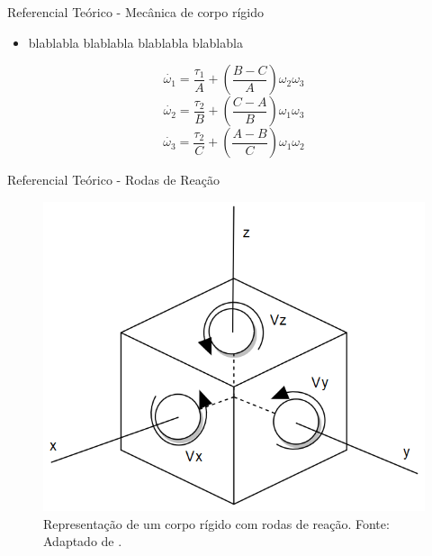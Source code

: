 \documentclass{beamer}
\begin{document}

\begin{frame}{Referencial Teórico - Mecânica de corpo rígido}
	\begin{itemize}
		\justifying
		\item blablabla blablabla blablabla blablabla
    \end{itemize}

	\begin{equation}
	  \dot{\omega_{1}}=\frac{\tau_{1}}{A}+\left(\frac{B-C}{A}\right)\omega_{2}\omega_{3}
	\end{equation}
	\begin{equation}
	  \dot{\omega_{2}}=\frac{\tau_{2}}{B}+\left(\frac{C-A}{B}\right)\omega_{1}\omega_{3}
	\end{equation}
	\begin{equation}
	  \dot{\omega_{3}}=\frac{\tau_{2}}{C}+\left(\frac{A-B}{C}\right)\omega_{1}\omega_{2}
	\end{equation}
\end{frame}


\begin{frame}{Referencial Teórico - Rodas de Reação}
    \begin{figure}[HT]
		\begin{center}
		\captionsetup{justification=centering}
        \includegraphics[scale=.42]{../referencial/img/satellite_controlhand_p1306}
        \caption{Representação de um corpo rígido com rodas de reação. \newline
        		 Fonte: Adaptado de .}
		\label{FIG_ADAPTATIVO}
        \end{center}
	\end{figure}
\end{frame}
\end{document}
